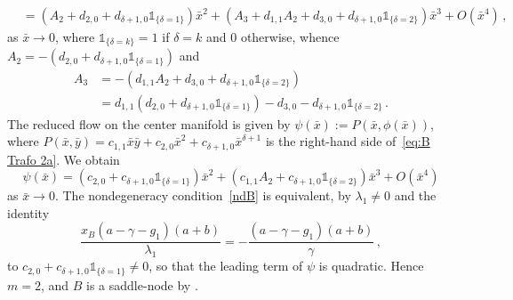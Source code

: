 \documentclass[reqno,11pt]{amsart}
\numberwithin{equation}{section}
\begin{document}
\begin{appendix}
\begin{equation*}
\begin{split}
&= (A_2 + d_{2,0} + d_{\delta+1,0}\mathds{1}_{\{ \delta =1\}} )  \bar{x}^2 + (A_3 + d_{1,1}A_2 + d_{3,0} + d_{\delta+1,0}\mathds{1}_{\{ \delta =2\}})  \bar{x}^3 + O(\bar{x}^4)\,,
\end{split}
\end{equation*}
as $\bar{x} \to 0$, where $\mathds{1}_{\{ \delta =k\}}=1$ if $\delta=k$ and $0$ otherwise, whence $A_2=-(d_{2,0}+d_{\delta+1,0}\mathds{1}_{\{\delta=1\}})$ and
\begin{equation*}
\begin{split}
A_3&=-(d_{1,1} A_2 + d_{3,0} + d_{\delta+1,0}\mathds{1}_{\{ \delta =2\}})\\
&=d_{1,1}(d_{2,0} + d_{\delta+1,0}\mathds{1}_{\{ \delta =1\}}) - d_{3,0} - d_{\delta+1,0}\mathds{1}_{\{ \delta =2\}}\,.
\end{split}
\end{equation*}
The reduced flow on the center manifold is given by $\psi(\bar{x}):= P(\bar{x},\phi(\bar{x}))$, where $P(\bar{x},\bar{y})=c_{1,1}\bar{x}\bar{y}+c_{2,0}\bar{x}^2+c_{\delta+1,0}\bar{x}^{\delta+1}$ is the right-hand side of~\eqref{eq:B Trafo 2a}. We obtain
\begin{equation*}
\psi(\bar{x}) = (c_{2,0} + c_{\delta+1,0}\mathds{1}_{\{ \delta =1\}}) \bar{x}^2 + ( c_{1,1}A_2 +c_{\delta+1,0}\mathds{1}_{\{ \delta =2\}}) \bar{x}^3 + O(\bar{x}^4)
\end{equation*}
as $\bar{x} \to 0$. The nondegeneracy condition~\eqref{ndB} is equivalent, by $\lambda_1\neq 0$ and the identity
\[
\frac{x_B(a-\gamma-g_1)(a+b)}{\lambda_1}=-\frac{(a-\gamma-g_1)(a+b)}{\gamma}\,,
\]
to $c_{2,0} + c_{\delta+1,0}\mathds{1}_{\{ \delta =1\}}\neq 0$, so that the leading term of $\psi$ is quadratic. Hence $m = 2$, and $B$ is a saddle-node by \cite[Thm.~1, Sec.~2.11]{Pe01}.\\
    

\end{appendix}
\end{document}
